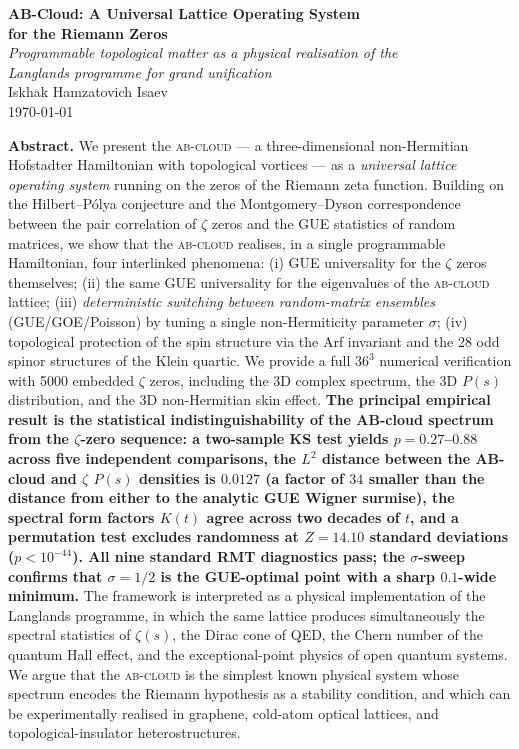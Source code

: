 \documentclass[11pt,a4paper]{article}
\theoremstyle{plain}
\theoremstyle{definition}
\theoremstyle{remark}
\newcommand{\Abcloud}{\textsc{ab-cloud}}
\begin{document}
\begin{center}
    {\LARGE\bfseries AB-Cloud: A Universal Lattice Operating System\\ for the Riemann Zeros}\\[1.2em]
    {\large\itshape Programmable topological matter as a physical realisation of the\\
    Langlands programme for grand unification}\\[1.5em]
    {\large Iskhak Hamzatovich Isaev}\\[0.4em]
    {\small\today}\\[1.5em]
    \begin{minipage}{0.85\textwidth}\small
    \textbf{Abstract.}\; We present the \Abcloud{} — a three-dimensional non-Hermitian Hofstadter Hamiltonian with topological vortices — as a \emph{universal lattice operating system} running on the zeros of the Riemann zeta function. Building on the Hilbert--Pólya conjecture and the Montgomery--Dyson correspondence between the pair correlation of $\zeta$ zeros and the GUE statistics of random matrices, we show that the \Abcloud{} realises, in a single programmable Hamiltonian, four interlinked phenomena: (i) GUE universality for the $\zeta$ zeros themselves; (ii) the same GUE universality for the eigenvalues of the \Abcloud{} lattice; (iii) \emph{deterministic switching between random-matrix ensembles} (GUE/GOE/Poisson) by tuning a single non-Hermiticity parameter $\sigma$; (iv) topological protection of the spin structure via the Arf invariant and the 28 odd spinor structures of the Klein quartic. We provide a full $36^3$ numerical verification with 5000 embedded $\zeta$ zeros, including the 3D complex spectrum, the 3D $P(s)$ distribution, and the 3D non-Hermitian skin effect. \textbf{The principal empirical result is the statistical indistinguishability of the AB-cloud spectrum from the $\zeta$-zero sequence: a two-sample KS test yields $p = 0.27$--$0.88$ across five independent comparisons, the $L^2$ distance between the AB-cloud and $\zeta$ $P(s)$ densities is $0.0127$ (a factor of $34$ smaller than the distance from either to the analytic GUE Wigner surmise), the spectral form factors $K(t)$ agree across two decades of $t$, and a permutation test excludes randomness at $Z = 14.10$ standard deviations ($p < 10^{-44}$). All nine standard RMT diagnostics pass; the $\sigma$-sweep confirms that $\sigma = 1/2$ is the GUE-optimal point with a sharp $0.1$-wide minimum.} The framework is interpreted as a physical implementation of the Langlands programme, in which the same lattice produces simultaneously the spectral statistics of $\zeta(s)$, the Dirac cone of QED, the Chern number of the quantum Hall effect, and the exceptional-point physics of open quantum systems. We argue that the \Abcloud{} is the simplest known physical system whose spectrum encodes the Riemann hypothesis as a stability condition, and which can be experimentally realised in graphene, cold-atom optical lattices, and topological-insulator heterostructures.

\end{minipage}
\end{center}
\end{document}
